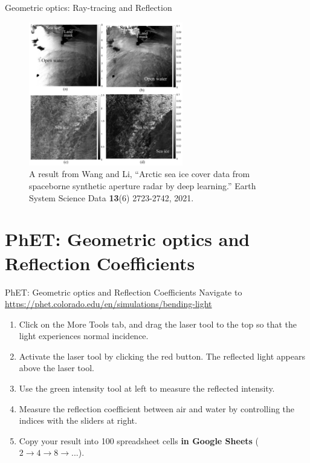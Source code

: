 \documentclass{beamer}
\begin{document}
\begin{frame}{Geometric optics: Ray-tracing and Reflection}
\begin{figure}
\centering
\includegraphics[width=0.6\textwidth]{figures/sea_ice.png}
\caption{\label{fig:sea} \footnotesize A result from Wang and Li, ``Arctic sea ice cover data from spaceborne synthetic aperture radar by deep learning.'' Earth System Science Data \textbf{13}(6) 2723-2742, 2021.}
\end{figure}
\end{frame}

\section{PhET: Geometric optics and Reflection Coefficients}

\begin{frame}{PhET: Geometric optics and Reflection Coefficients}
Navigate to \url{https://phet.colorado.edu/en/simulations/bending-light} \\
\begin{enumerate}
\item Click on the More Tools tab, and drag the laser tool to the top so that the light experiences normal incidence.
\item Activate the laser tool by clicking the red button.  The reflected light appears above the laser tool.
\item Use the green intensity tool at left to measure the reflected intensity.
\item Measure the reflection coefficient between air and water by controlling the indices with the sliders at right.
\item Copy your result into 100 spreadsheet cells \textbf{in Google Sheets} ($2 \to 4 \to 8 \to ...$).
\end{enumerate}
\end{frame}
\end{document}
